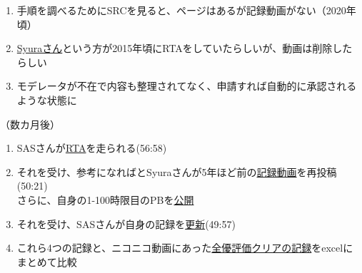 \begin{enumerate}[label={\sarrow}]
\item 手順を調べるためにSRCを見ると、ページはあるが記録動画がない（2020年頃）
\item \href{https://www.speedrun.com/users/Syura}{Syuraさん}という方が2015年頃にRTAをしていたらしいが、動画は削除したらしい
\item モデレータが不在で内容も整理されてなく、申請すれば自動的に承認されるような状態に
\end{enumerate}
（数カ月後）
\begin{enumerate}[label={\sarrow}]
\item SASさんが\href{https://www.speedrun.com/komeiji_satori_no_jousou_kyouiku/runs/znol46vy}{RTA}を走られる(56:58)
\item それを受け、参考になればとSyuraさんが5年ほど前の\href{https://www.speedrun.com/komeiji_satori_no_jousou_kyouiku/runs/m3n4v8qy}{記録動画}を再投稿(50:21)\\
      さらに、自身の1-100時限目のPBを\href{https://pastebin.com/0nH3mJSZ}{公開}
\item それを受け、SASさんが自身の記録を\href{https://www.speedrun.com/komeiji_satori_no_jousou_kyouiku/runs/m3ro3edm}{更新}(49:57)
\item これら4つの記録と、ニコニコ動画にあった\href{https://www.nicovideo.jp/watch/sm18710850}{全優評価クリアの記録}をexcelにまとめて比較
\end{enumerate}





\begin{appendices}
\end{appendices}

